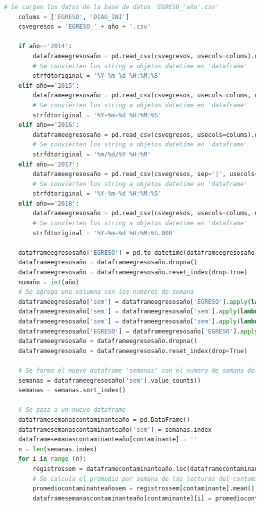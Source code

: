 \begin{lstlisting}[language=Python, caption=Procedimiento del segundo paso, label=lst:c1]
    # Se cargan los datos de la base de datos 'EGRESO_'año'.csv'
    colums = ['EGRESO', 'DIAG_INI']
    csvegresos = 'EGRESO_' + año + '.csv'

    if año=='2014':
        dataframeegresosaño = pd.read_csv(csvegresos, usecols=colums).dropna()
        # Se convierten los string a objetos datetime en 'dataframe'
        strfdtoriginal = '%Y-%m-%d %H:%M:%S'
    elif año=='2015':
        dataframeegresosaño = pd.read_csv(csvegresos, usecols=colums, nrows=2500000).dropna()
        # Se convierten los string a objetos datetime en 'dataframe'
        strfdtoriginal = '%Y-%m-%d %H:%M:%S'
    elif año=='2016':
        dataframeegresosaño = pd.read_csv(csvegresos, usecols=colums).dropna()
        # Se convierten los string a objetos datetime en 'dataframe'
        strfdtoriginal = '%m/%d/%Y %H:%M'
    elif año=='2017':
        dataframeegresosaño = pd.read_csv(csvegresos, sep='|', usecols=colums, nrows=1500000).dropna()
        # Se convierten los string a objetos datetime en 'dataframe'
        strfdtoriginal = '%Y-%m-%d %H:%M:%S'
    elif año=='2018':
        dataframeegresosaño = pd.read_csv(csvegresos, usecols=colums, nrows=1000000).dropna()
        # Se convierten los string a objetos datetime en 'dataframe'
        strfdtoriginal = '%Y-%m-%d %H:%M:%S.000'
    
    dataframeegresosaño['EGRESO'] = pd.to_datetime(dataframeegresosaño['EGRESO'], errors = 'coerce', format=strfdtoriginal)
    dataframeegresosaño = dataframeegresosaño.dropna()
    dataframeegresosaño = dataframeegresosaño.reset_index(drop=True)
    numaño = int(año) 
    # Se agrega una columna con los numeros de semana
    dataframeegresosaño['sem'] = dataframeegresosaño['EGRESO'].apply(lambda x: date(x.year, x.month, x.day))
    dataframeegresosaño['sem'] = dataframeegresosaño['sem'].apply(lambda x: Week.fromdate(x))
    dataframeegresosaño['sem'] = dataframeegresosaño['sem'].apply(lambda x: x.week)
    dataframeegresosaño['EGRESO'] = dataframeegresosaño['EGRESO'].apply(lambda x: x if(x.year==numaño) else pd.NaT)   
    dataframeegresosaño = dataframeegresosaño.dropna()
    dataframeegresosaño = dataframeegresosaño.reset_index(drop=True)

    # Se forma el nuevo dataframe 'semanas' con el numero de semana del año y la cantidad de egresos en cada semana
    semanas = dataframeegresosaño['sem'].value_counts()
    semanas = semanas.sort_index()

    # Se pasa a un nuevo dataframe
    dataframesemanascontaminanteaño = pd.DataFrame()
    dataframesemanascontaminanteaño['sem'] = semanas.index
    dataframesemanascontaminanteaño[contaminante] = ''
    n = len(semanas.index)
    for i in range (n):
        registrossem = dataframecontaminanteaño.loc[dataframecontaminanteaño['sem'] == i+1]
        # Se calcula el promedio por semana de las lecturas del contaminante registradas 
        promediocontaminanteañosem = registrossem[contaminante].mean()
        dataframesemanascontaminanteaño[contaminante][i] = promediocontaminanteañosem
\end{lstlisting}

